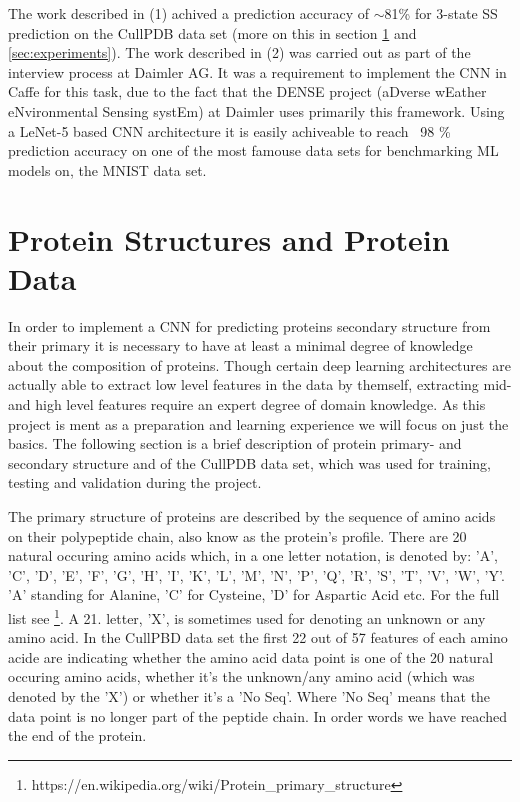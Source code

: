 \documentclass{article}
\begin{document}
The work described in (1) achived a prediction accuracy of $\sim$81\% for 3-state SS prediction on the CullPDB data set (more on this in section \ref{sec:protein-structures} and \ref{sec:experiments}). The work described in (2) was carried out as part of the interview process at Daimler AG. It was a requirement to implement the CNN in Caffe for this task, due to the fact that the DENSE project (aDverse wEather eNvironmental Sensing systEm) at Daimler uses primarily this framework. Using a LeNet-5 based CNN architecture it is easily achiveable to reach ~98 \% prediction accuracy on one of the most famouse data sets for benchmarking ML models on, the MNIST data set.

\section{Protein Structures and Protein Data}
\label{sec:protein-structures}
In order to implement a CNN for predicting proteins secondary structure from their  primary it is necessary to have at least a minimal degree of knowledge about the composition of proteins. Though certain deep learning architectures are actually able to extract low level features in the data by themself, extracting mid- and high level features require an expert degree of domain knowledge. As this project is ment as a preparation and learning experience we will focus on just the basics. The following section is a brief description of protein primary- and secondary structure and of the CullPDB data set, which was used for training, testing and validation during the project.  

The primary structure of proteins are described by the sequence of amino acids on their polypeptide chain, also know as the protein's profile. There are 20 natural occuring amino acids which, in a one letter notation, is denoted by: 'A', 'C', 'D', 'E', 'F', 'G', 'H', 'I', 'K', 'L', 'M', 'N', 'P', 'Q', 'R', 'S', 'T', 'V', 'W', 'Y'. 'A' standing for Alanine, 'C' for Cysteine, 'D' for Aspartic Acid etc. For the full list see \footnote{https://en.wikipedia.org/wiki/Protein\_primary\_structure}. A 21. letter, 'X', is sometimes used for denoting an unknown or any amino acid. In the CullPBD data set the first 22 out of 57 features of each amino acide are indicating whether the amino acid data point is one of the 20 natural occuring amino acids, whether it's the unknown/any amino acid (which was denoted by the 'X') or whether it's a 'No Seq'. Where 'No Seq' means that the data point is no longer part of the peptide chain. In order words we have reached the end of the protein. 
\end{document}
